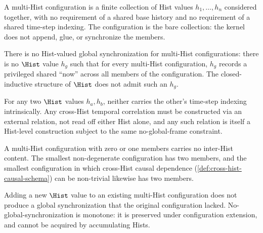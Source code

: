 \begin{definition}
\label{def:multi-hist-config}
A multi-Hist configuration is a finite collection of Hist values \(h_1, \ldots, h_n\) considered together, with no requirement of a shared base history and no requirement of a shared time-step indexing. The configuration is the bare collection: the kernel does not append, glue, or synchronize the members.
\end{definition}
\begin{definition}
\label{def:no-global-sync}
There is no Hist-valued global synchronization for multi-Hist configurations: there is no \(\Hist\) value \(h_g\) such that for every multi-Hist configuration, \(h_g\) records a privileged shared ``now'' across all members of the configuration. The closed-inductive structure of \(\Hist\) does not admit such an \(h_g\).
\end{definition}
\begin{theorem}
\label{thm:hists-frame-independent}
For any two \(\Hist\) values \(h_a, h_b\), neither carries the other's time-step indexing intrinsically. Any cross-Hist temporal correlation must be constructed via an external relation, not read off either Hist alone, and any such relation is itself a Hist-level construction subject to the same no-global-frame constraint.
\end{theorem}
\begin{lemma}
\label{lem:empty-config-degenerate}
A multi-Hist configuration with zero or one members carries no inter-Hist content. The smallest non-degenerate configuration has two members, and the smallest configuration in which cross-Hist causal dependence (\autoref{def:cross-hist-causal-schema}) can be non-trivial likewise has two members.
\end{lemma}
\begin{lemma}
\label{lem:extension-preserves-no-sync}
Adding a new \(\Hist\) value to an existing multi-Hist configuration does not produce a global synchronization that the original configuration lacked. No-global-synchronization is monotone: it is preserved under configuration extension, and cannot be acquired by accumulating Hists.
\end{lemma}
